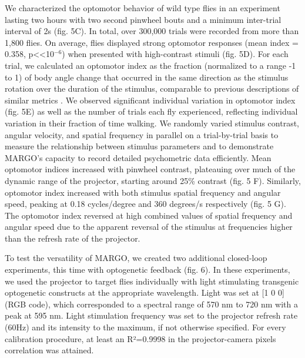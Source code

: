 \documentclass[10pt]{article}
\begin{document}
\begin{multicols}{2}
We characterized the optomotor behavior of wild type flies in an experiment lasting two hours with two second pinwheel bouts and a minimum inter-trial interval of 2s (fig. 5C). In total, over 300,000 trials were recorded from more than 1,800 flies. On average, flies displayed strong optomotor responses (mean index = 0.358, p<<10$^{-6}$) when presented with high-contrast stimuli (fig. 5D). For each trial, we calculated an optomotor index as the fraction (normalized to a range -1 to 1) of body angle change that occurred in the same direction as the stimulus rotation over the duration of the stimulus, comparable to previous descriptions of similar metrics \cite{Seelig_Two_2010}. We observed significant individual variation in optomotor index (fig. 5E) as well as the number of trials each fly experienced, reflecting individual variation in their fraction of time walking. We randomly varied stimulus contrast, angular velocity, and spatial frequency in parallel on a trial-by-trial basis to measure the relationship between stimulus parameters and to demonstrate MARGO's capacity to record detailed psychometric data efficiently. Mean optomotor indices increased with pinwheel contrast, plateauing over much of the dynamic range of the projector, starting around 25\% contrast (fig. 5 F). Similarly, optomotor index increased with both stimulus spatial frequency and angular speed, peaking at 0.18 cycles/degree and 360 degrees/s respectively (fig. 5 G). The optomotor index reversed at high combined values of spatial frequency and angular speed due to the apparent reversal of the stimulus at frequencies higher than the refresh rate of the projector.

To test the versatility of MARGO, we created two additional closed-loop experiments, this time with optogenetic feedback (fig. 6). In these  experiments, we used the projector to target flies individually with light stimulating transgenic optogenetic constructs at the appropriate wavelength. Light was set at [1 0 0] (RGB code), which corresponded to a spectral range of 570 nm to 720 nm with a peak at 595 nm. Light stimulation frequency was set to the projector refresh rate (60Hz) and its intensity to the maximum, if not otherwise specified. For every calibration procedure, at least an R²=0.9998 in the projector-camera pixels correlation was attained.


\end{multicols}
\end{document}
